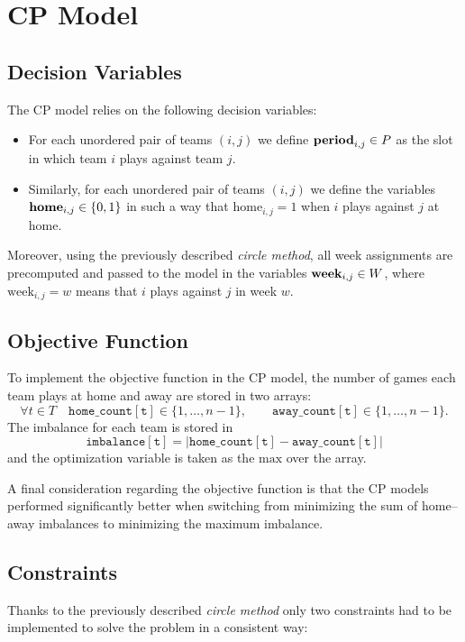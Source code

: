 \section{CP Model}

\subsection{Decision Variables}
The CP model relies on the following decision variables:

\begin{itemize}
    \item For each unordered pair of teams $(i,j)$ we define $\text{\textbf{period}}_{i,j} \in P$ as the slot in which team $i$ plays against team $j.$
    \item Similarly, for each unordered pair of teams $(i,j)$ we define the variables $\text{\textbf{home}}_{i,j}\in \{0, 1\}$ in such a way that $\text{home}_{i,j}=1$ when $i$ plays against $j$ at home.
\end{itemize}

Moreover, using the previously described \emph{circle method}, all week assignments are precomputed and passed to the model in the variables $\text{\textbf{week}}_{i,j} \in W$, where $\text{week}_{i,j} = w$ means that $i$ plays against $j$ in week $w$.

\subsection{Objective Function}
To implement the objective function in the CP model, the number of games each team plays at home and away are stored in two arrays:
\[
\forall t \in T \quad \mathtt{home\_count[t]} \in \{1, \dots, n-1\}, 
\qquad
\mathtt{away\_count[t]} \in \{1, \dots, n-1\}.
\]
The imbalance for each team is stored in
\[
\mathtt{imbalance[t]} = \lvert \mathtt{home\_count[t]} - \mathtt{away\_count[t]} \rvert
\]
and the optimization variable is taken as the $\text{max}$ over the array.

A final consideration regarding the objective function is that the CP models performed significantly better when switching from minimizing the sum of home–away imbalances to minimizing the maximum imbalance.

\subsection{Constraints}
Thanks to the previously described \emph{circle method} only two constraints had to be implemented to solve the problem in a consistent way:

